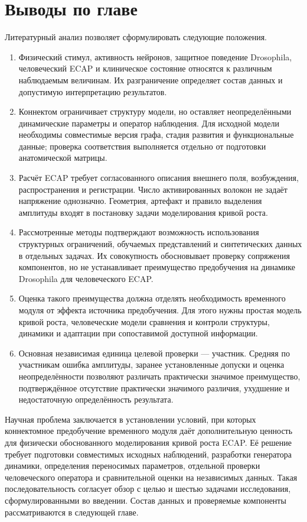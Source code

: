 \section*{Выводы по главе}
{}

Литературный анализ позволяет сформулировать следующие положения.
\begin{enumerate}
\item Физический стимул, активность нейронов, защитное поведение Drosophila, человеческий ECAP и клиническое состояние относятся к различным наблюдаемым величинам. Их разграничение определяет состав данных и допустимую интерпретацию результатов.
\item Коннектом ограничивает структуру модели, но оставляет неопределёнными динамические параметры и оператор наблюдения. Для исходной модели необходимы совместимые версия графа, стадия развития и функциональные данные; проверка соответствия выполняется отдельно от подготовки анатомической матрицы.
\item Расчёт ECAP требует согласованного описания внешнего поля, возбуждения, распространения и регистрации. Число активированных волокон не задаёт напряжение однозначно. Геометрия, артефакт и правило выделения амплитуды входят в постановку задачи моделирования кривой роста.
\item Рассмотренные методы подтверждают возможность использования структурных ограничений, обучаемых представлений и синтетических данных в отдельных задачах. Их совокупность обосновывает проверку сопряжения компонентов, но не устанавливает преимущество предобучения на динамике Drosophila для человеческого ECAP.
\item Оценка такого преимущества должна отделять необходимость временного модуля от эффекта источника предобучения. Для этого нужны простая модель кривой роста, человеческие модели сравнения и контроли структуры, динамики и адаптации при сопоставимой доступной информации.
\item Основная независимая единица целевой проверки --- участник. Средняя по участникам ошибка амплитуды, заранее установленные допуски и оценка неопределённости позволяют различать практически значимое преимущество, подтверждённое отсутствие практически значимого различия, ухудшение и недостаточную определённость результата.
\end{enumerate}

Научная проблема заключается в установлении условий, при которых коннектомное предобучение временного модуля даёт дополнительную ценность для физически обоснованного моделирования кривой роста ECAP. Её решение требует подготовки совместимых исходных наблюдений, разработки генератора динамики, определения переносимых параметров, отдельной проверки человеческого оператора и сравнительной оценки на независимых данных. Такая последовательность согласует обзор с целью и шестью задачами исследования, сформулированными во введении. Состав данных и проверяемые компоненты рассматриваются в следующей главе.
